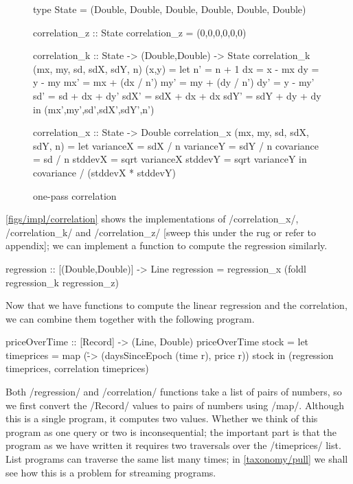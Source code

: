 \begin{figure}
\begin{haskell}
type State = (Double, Double, Double, Double, Double, Double)

correlation_z :: State
correlation_z = (0,0,0,0,0,0)

correlation_k :: State -> (Double,Double) -> State
correlation_k (mx, my, sd, sdX, sdY, n) (x,y) =
 let n'   = n   + 1
     dx   = x   - mx
     dy   = y   - my
     mx'  = mx  + (dx / n')
     my'  = my  + (dy / n')
     dy'  = y   - my'
     sd'  = sd  + dx + dy'
     sdX' = sdX + dx + dx
     sdY' = sdY + dy + dy
 in (mx',my',sd',sdX',sdY',n')

correlation_x :: State -> Double
correlation_x (mx, my, sd, sdX, sdY, n) =
  let varianceX  = sdX / n
      varianceY  = sdY / n
      covariance = sd  / n
      stddevX = sqrt varianceX
      stddevY = sqrt varianceY
  in covariance / (stddevX * stddevY)
\end{haskell}
\caption[One-pass correlation]{one-pass correlation }
\label{figs/impl/correlation}
\end{figure}

\autoref{figs/impl/correlation} shows the implementations of \Hs/correlation_x/, \Hs/correlation_k/ and \Hs/correlation_z/ [sweep this under the rug or refer to appendix]; we can implement a function to compute the regression similarly.

\begin{haskell}
regression :: [(Double,Double)] -> Line
regression = regression_x (foldl regression_k regression_z)
\end{haskell}

Now that we have functions to compute the linear regression and the correlation, we can combine them together with the following program.

\begin{haskell}
priceOverTime :: [Record] -> (Line, Double)
priceOverTime stock =
  let timeprices = map (\r -> (daysSinceEpoch (time r), price r)) stock
  in (regression timeprices, correlation timeprices)
\end{haskell}

Both \Hs/regression/ and \Hs/correlation/ functions take a list of pairs of numbers, so we first convert the \Hs/Record/ values to pairs of numbers using \Hs/map/.
Although this is a single program, it computes two values.
Whether we think of this program as one query or two is inconsequential; the important part is that the program as we have written it requires two traversals over the \Hs/timeprices/ list.
List programs can traverse the same list many times; in \autoref{taxonomy/pull} we shall see how this is a problem for streaming programs.

